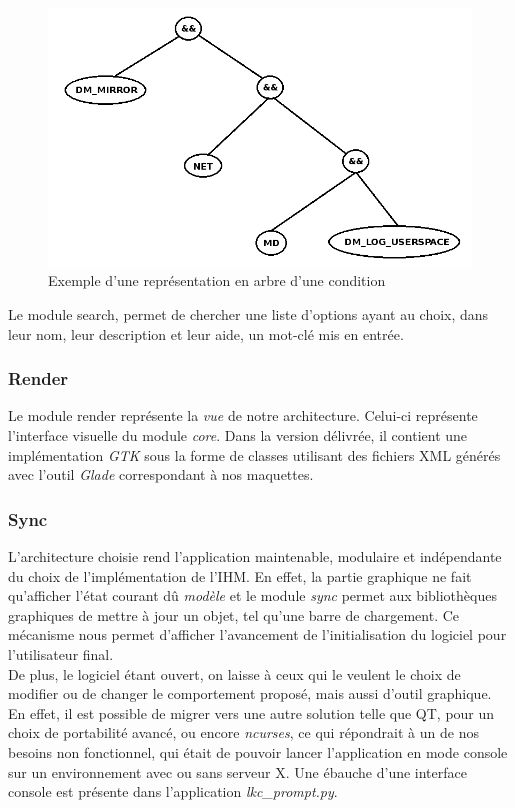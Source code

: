 \documentclass[17pts]{report}
\begin{document}
\begin{figure}[H]
    \includegraphics[scale=0.5]{illustrations/condition_tree.png}
    \centering
    \caption{Exemple d'une représentation en arbre d'une condition}
    \label{fig:condTree}
\end{figure}

Le module search, permet de chercher une liste d'options ayant au choix, dans
leur nom, leur description et leur aide, un mot-clé mis en entrée.

\subsubsection{Render}
\label{ssub:Render}
Le module render représente la \textit{vue} de notre architecture.  Celui-ci
représente l'interface visuelle du module \textit{core}.  Dans la version
délivrée, il contient une implémentation \textit{GTK} sous la forme de classes
utilisant des fichiers XML générés avec l'outil \textit{Glade} correspondant à
nos maquettes.

\subsubsection{Sync}
\label{ssub:Sync}
L'architecture choisie rend l'application maintenable, modulaire et
indépendante du choix de l'implémentation de l'IHM. En effet, la partie
graphique ne fait qu'afficher l'état courant dû \textit{modèle} et le module
\textit{sync} permet aux bibliothèques graphiques de mettre à jour un objet,
tel qu'une barre de chargement. Ce mécanisme nous permet d'afficher
l'avancement de l'initialisation du logiciel pour l'utilisateur final.  \\

De plus, le logiciel étant ouvert, on laisse à ceux qui le veulent le choix de
modifier ou de changer le comportement proposé, mais aussi d'outil graphique.
En effet, il est possible de migrer vers une autre solution telle que QT, pour
un choix de portabilité avancé,  ou encore \textit{ncurses}, ce qui répondrait
à un de nos besoins non fonctionnel, qui était de pouvoir lancer l'application
en mode console sur un environnement avec ou sans serveur X.  Une ébauche d'une
interface console est présente dans l'application \textit{lkc\_prompt.py}. \\
\end{document}
